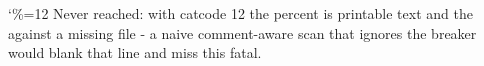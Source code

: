 \documentclass{article}
\begin{document}
\catcode`\%=12
% 
Never reached: with catcode 12 the percent is printable text and the
 against a missing file - a naive comment-aware scan that
ignores the breaker would blank that line and miss this fatal.
\end{document}
